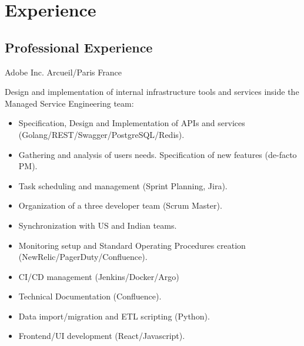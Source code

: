 \documentclass[10pt,a4paper,sans]{moderncv}        %
\begin{document}
\maketitle

\section{Experience}

\subsection{Professional Experience}
        {Adobe Inc.}
        {Arcueil/Paris}
        {France}
        {}

        {}
        {}
        {}
        {Design and implementation of internal infrastructure tools and services inside the Managed Service Engineering team:
        \begin{itemize}
            \item Specification, Design and Implementation of APIs and services (Golang/REST/Swagger/PostgreSQL/Redis).
            \item Gathering and analysis of users needs. Specification of new features (de-facto PM).
            \item Task scheduling and management (Sprint Planning, Jira).
            \item Organization of a three developer team (Scrum Master).
            \item Synchronization with US and Indian teams.
            \item Monitoring setup and Standard Operating Procedures creation (NewRelic/PagerDuty/Confluence).
            \item CI/CD management (Jenkins/Docker/Argo)
            \item Technical Documentation (Confluence).
            \item Data import/migration and ETL scripting (Python).
            \item Frontend/UI development (React/Javascript).
        \end{itemize}
        }
\end{document}

